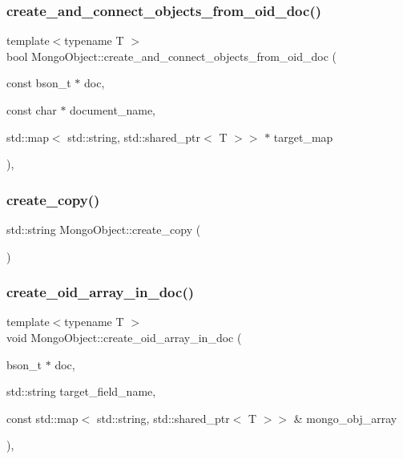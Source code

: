 \subsubsection{\texorpdfstring{create\+\_\+and\+\_\+connect\+\_\+objects\+\_\+from\+\_\+oid\+\_\+doc()}{create\_and\_connect\_objects\_from\_oid\_doc()}}
{\footnotesize\ttfamily template$<$typename T $>$ \\
bool Mongo\+Object\+::create\+\_\+and\+\_\+connect\+\_\+objects\+\_\+from\+\_\+oid\+\_\+doc (\begin{DoxyParamCaption}\item[{const bson\+\_\+t $\ast$}]{doc,  }\item[{const char $\ast$}]{document\+\_\+name,  }\item[{std\+::map$<$ std\+::string, std\+::shared\+\_\+ptr$<$ T $>$$>$ $\ast$}]{target\+\_\+map }\end{DoxyParamCaption})\hspace{0.3cm}{\ttfamily [inline]}, {\ttfamily [protected]}}

\mbox{\label{class_mongo_object_ad5165ed92020fba7d502a3556794ab4f}} 
\subsubsection{\texorpdfstring{create\+\_\+copy()}{create\_copy()}}
{\footnotesize\ttfamily std\+::string Mongo\+Object\+::create\+\_\+copy (\begin{DoxyParamCaption}{ }\end{DoxyParamCaption})}

\mbox{\label{class_mongo_object_a0b94ea01312b792e42b944399a4eb45c}} 
\subsubsection{\texorpdfstring{create\+\_\+oid\+\_\+array\+\_\+in\+\_\+doc()}{create\_oid\_array\_in\_doc()}}
{\footnotesize\ttfamily template$<$typename T $>$ \\
void Mongo\+Object\+::create\+\_\+oid\+\_\+array\+\_\+in\+\_\+doc (\begin{DoxyParamCaption}\item[{bson\+\_\+t $\ast$}]{doc,  }\item[{std\+::string}]{target\+\_\+field\+\_\+name,  }\item[{const std\+::map$<$ std\+::string, std\+::shared\+\_\+ptr$<$ T $>$$>$ \&}]{mongo\+\_\+obj\+\_\+array }\end{DoxyParamCaption})\hspace{0.3cm}{\ttfamily [inline]}, {\ttfamily [protected]}}

